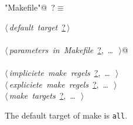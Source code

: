 \documentclass[twoside]{artikel3}
\renewcommand{\NWlink}[2]{\hyperlink{#1}{#2}}
\renewcommand{\NWtarget}[2]{\hypertarget{#1}{#2}}
\renewcommand{\NWsep}{$\diamond$\rule[-1\baselineskip]{0pt}{1\baselineskip}}
\renewcommand{\NWlink}[2]{\hyperlink{#1}{#2}}
\renewcommand{\NWtarget}[2]{\hypertarget{#1}{#2}}
\begin{document}
\begin{flushleft} \small
\begin{minipage}{\linewidth}\label{scrap7}\raggedright\small
\NWtarget{nuweb?}{} \verb@"Makefile"@\nobreak\ {\footnotesize {?}}$\equiv$
\vspace{-1ex}
\begin{list}{}{} \item
\mbox{}\verb@@\hbox{$\langle\,${\itshape default target}\nobreak\ {\footnotesize \NWlink{nuweb?}{?}}$\,\rangle$}\verb@@\\
\mbox{}\verb@@\\
\mbox{}\verb@@\hbox{$\langle\,${\itshape parameters in Makefile}\nobreak\ {\footnotesize \NWlink{nuweb?}{?}, \ldots\ }$\,\rangle$}\verb@ @\\
\mbox{}\verb@@\\
\mbox{}\verb@@\hbox{$\langle\,${\itshape impliciete make regels}\nobreak\ {\footnotesize \NWlink{nuweb?}{?}, \ldots\ }$\,\rangle$}\verb@@\\
\mbox{}\verb@@\hbox{$\langle\,${\itshape expliciete make regels}\nobreak\ {\footnotesize \NWlink{nuweb?}{?}, \ldots\ }$\,\rangle$}\verb@@\\
\mbox{}\verb@@\hbox{$\langle\,${\itshape make targets}\nobreak\ {\footnotesize \NWlink{nuweb?}{?}, \ldots\ }$\,\rangle$}\verb@@\\
\mbox{}\verb@@{\NWsep}
\end{list}
\vspace{-1.5ex}
\footnotesize
\begin{list}{}{\setlength{\itemsep}{-\parsep}\setlength{\itemindent}{-\leftmargin}}

\item{}
\end{list}
\end{minipage}\vspace{4ex}
\end{flushleft}
The default target of make is \verb|all|.
\end{document}
